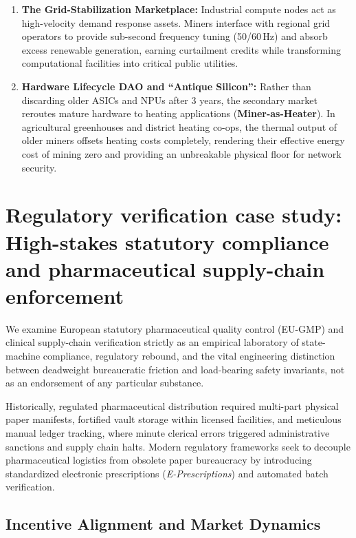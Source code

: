 \documentclass[a4paper,11pt,twoside,parskip=half-,headings=small]{scrartcl}
\begin{document}
\begin{enumerate}[nosep]
  \item \textbf{The Grid-Stabilization Marketplace:} Industrial compute nodes act as high-velocity demand response assets. Miners interface with regional grid operators to provide sub-second frequency tuning (50/60\,Hz) and absorb excess renewable generation, earning curtailment credits while transforming computational facilities into critical public utilities.
  \item \textbf{Hardware Lifecycle DAO and ``Antique Silicon'':} Rather than discarding older ASICs and NPUs after 3 years, the secondary market reroutes mature hardware to heating applications (\textbf{Miner-as-Heater}). In agricultural greenhouses and district heating co-ops, the thermal output of older miners offsets heating costs completely, rendering their effective energy cost of mining zero and providing an unbreakable physical floor for network security.
\end{enumerate}


\section{Regulatory verification case study: High-stakes statutory compliance and pharmaceutical supply-chain enforcement}
\label{sec:statutory_compliance}

We examine European statutory pharmaceutical quality control (EU-GMP) and clinical supply-chain verification strictly
as an empirical laboratory of state-machine compliance, regulatory rebound, and the
vital engineering distinction between deadweight bureaucratic friction and
load-bearing safety invariants, not as an endorsement of any particular substance.

Historically, regulated pharmaceutical distribution required multi-part physical paper manifests, fortified vault storage within licensed facilities, and meticulous manual ledger tracking, where minute clerical errors triggered administrative sanctions and supply chain halts. Modern regulatory frameworks seek to decouple pharmaceutical logistics from obsolete paper bureaucracy by introducing standardized electronic prescriptions (\emph{E-Prescriptions}) and automated batch verification.

\subsection{Incentive Alignment and Market Dynamics}
\end{document}
